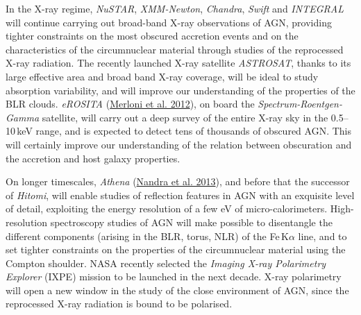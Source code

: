 \documentclass{natureprintstyle}
\begin{document}
{In the X-ray regime, {\it NuSTAR}, {\it XMM-Newton}, {\it Chandra}, {\it Swift} and {\it INTEGRAL} will continue carrying out broad-band X-ray observations of AGN, providing tighter constraints on the most obscured accretion events and on the characteristics of the circumnuclear material through studies of the reprocessed X-ray radiation.} The recently launched X-ray satellite {\it ASTROSAT}\cite{Singh:2014pd}, thanks to its large effective area and broad band X-ray coverage, will be ideal to study absorption variability, and will improve our understanding of the properties of the BLR clouds. {\it eROSITA} (\href{http://adsabs.harvard.edu/abs/2012arXiv1209.3114M}{Merloni et al. 2012}), on board the {\it Spectrum-Roentgen-Gamma} satellite, will carry out a deep survey of the entire X-ray sky in the 0.5--10\,keV range, and is expected to detect tens of thousands of obscured AGN. {This will certainly improve} our understanding of the relation between obscuration and the accretion and host galaxy properties.

On longer timescales, {\it Athena} (\href{http://adsabs.harvard.edu/abs/2013arXiv1306.2307N}{Nandra et al. 2013}), and before that the successor of {\it Hitomi}, will enable studies of reflection features in AGN with an exquisite level of detail, exploiting the energy resolution of a few eV of micro-calorimeters. High-resolution spectroscopy studies of AGN {will make possible to disentangle} the different components (arising in the BLR, torus, NLR) of the Fe\,K$\alpha$ line, and to set tighter constraints on the properties of the circumnuclear material using the Compton shoulder\cite{Odaka:2016fv}.
NASA recently selected the {\it Imaging X-ray Polarimetry Explorer}\cite{Weisskopf:2016qd} (IXPE) mission to be launched in the next decade. X-ray polarimetry will open a new window in the study of the close environment of AGN, since the reprocessed X-ray radiation is bound to be polarised. 
\end{document}
